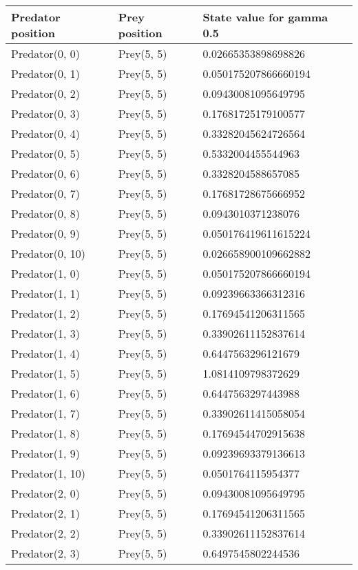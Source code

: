 \begin{longtable}{| p{} | p{} | p{} |} 
   Predator position & Prey position & State value for gamma 0.5 \\
    \hline
Predator(0, 0) & Prey(5, 5) &0.02665353898698826\\
Predator(0, 1) & Prey(5, 5) &0.050175207866660194\\
Predator(0, 2) & Prey(5, 5) &0.09430081095649795\\
Predator(0, 3) & Prey(5, 5) &0.17681725179100577\\
Predator(0, 4) & Prey(5, 5) &0.33282045624726564\\
Predator(0, 5) & Prey(5, 5) &0.5332004455544963\\
Predator(0, 6) & Prey(5, 5) &0.3328204588657085\\
Predator(0, 7) & Prey(5, 5) &0.17681728675666952\\
Predator(0, 8) & Prey(5, 5) &0.0943010371238076\\
Predator(0, 9) & Prey(5, 5) &0.050176419611615224\\
Predator(0, 10) & Prey(5, 5) &0.026658900109662882\\
Predator(1, 0) & Prey(5, 5) &0.050175207866660194\\
Predator(1, 1) & Prey(5, 5) &0.09239663366312316\\
Predator(1, 2) & Prey(5, 5) &0.17694541206311565\\
Predator(1, 3) & Prey(5, 5) &0.33902611152837614\\
Predator(1, 4) & Prey(5, 5) &0.6447563296121679\\
Predator(1, 5) & Prey(5, 5) &1.0814109798372629\\
Predator(1, 6) & Prey(5, 5) &0.6447563297443988\\
Predator(1, 7) & Prey(5, 5) &0.33902611415058054\\
Predator(1, 8) & Prey(5, 5) &0.17694544702915638\\
Predator(1, 9) & Prey(5, 5) &0.09239693379136613\\
Predator(1, 10) & Prey(5, 5) &0.0501764115954377\\
Predator(2, 0) & Prey(5, 5) &0.09430081095649795\\
Predator(2, 1) & Prey(5, 5) &0.17694541206311565\\
Predator(2, 2) & Prey(5, 5) &0.33902611152837614\\
Predator(2, 3) & Prey(5, 5) &0.6497545802244536\\

\end{longtable}
